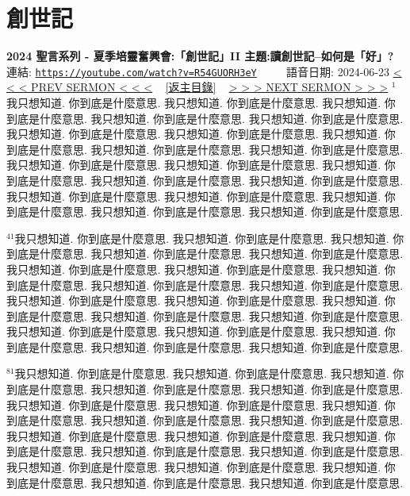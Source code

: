 \documentclass{book}
\begin{document}
\section{創世記}
\label{sec:R54GUORH3eY}
\textbf{2024 聖言系列 - 夏季培靈奮興會:「創世記」II 主題:讀創世記–如何是「好」?}
\newline
\newline
連結: \href{https://youtube.com/watch?v=R54GUORH3eY}{\texttt{https://youtube.com/watch?v=R54GUORH3eY}} ~~~~ 語音日期: 2024-06-23
\newline
\newline
\hyperref[sec:EZL_OCl_lJE]{\small{< < < PREV SERMON < < <}}
~
\hyperref[sec:index]{\small{[返主目錄]}}
~
\hyperref[sec:iBfE9eVripQ]{\small{> > > NEXT SERMON > > >}}
\newline
\newline
$^{1}$我只想知道.
你到底是什麼意思.
我只想知道.
你到底是什麼意思.
我只想知道.
你到底是什麼意思.
我只想知道.
你到底是什麼意思.
我只想知道.
你到底是什麼意思.
我只想知道.
你到底是什麼意思.
我只想知道.
你到底是什麼意思.
我只想知道.
你到底是什麼意思.
我只想知道.
你到底是什麼意思.
我只想知道.
你到底是什麼意思.
我只想知道.
你到底是什麼意思.
我只想知道.
你到底是什麼意思.
我只想知道.
你到底是什麼意思.
我只想知道.
你到底是什麼意思.
我只想知道.
你到底是什麼意思.
我只想知道.
你到底是什麼意思.
我只想知道.
你到底是什麼意思.
我只想知道.
你到底是什麼意思.
我只想知道.
你到底是什麼意思.
我只想知道.
你到底是什麼意思.

$^{41}$我只想知道.
你到底是什麼意思.
我只想知道.
你到底是什麼意思.
我只想知道.
你到底是什麼意思.
我只想知道.
你到底是什麼意思.
我只想知道.
你到底是什麼意思.
我只想知道.
你到底是什麼意思.
我只想知道.
你到底是什麼意思.
我只想知道.
你到底是什麼意思.
我只想知道.
你到底是什麼意思.
我只想知道.
你到底是什麼意思.
我只想知道.
你到底是什麼意思.
我只想知道.
你到底是什麼意思.
我只想知道.
你到底是什麼意思.
我只想知道.
你到底是什麼意思.
我只想知道.
你到底是什麼意思.
我只想知道.
你到底是什麼意思.
我只想知道.
你到底是什麼意思.
我只想知道.
你到底是什麼意思.
我只想知道.
你到底是什麼意思.
我只想知道.
你到底是什麼意思.

$^{81}$我只想知道.
你到底是什麼意思.
我只想知道.
你到底是什麼意思.
我只想知道.
你到底是什麼意思.
我只想知道.
你到底是什麼意思.
我只想知道.
你到底是什麼意思.
我只想知道.
你到底是什麼意思.
我只想知道.
你到底是什麼意思.
我只想知道.
你到底是什麼意思.
我只想知道.
你到底是什麼意思.
我只想知道.
你到底是什麼意思.
我只想知道.
你到底是什麼意思.
我只想知道.
你到底是什麼意思.
我只想知道.
你到底是什麼意思.
我只想知道.
你到底是什麼意思.
我只想知道.
你到底是什麼意思.
我只想知道.
你到底是什麼意思.
我只想知道.
你到底是什麼意思.
我只想知道.
你到底是什麼意思.
我只想知道.
你到底是什麼意思.
我只想知道.
你到底是什麼意思.
\end{document}
